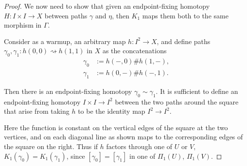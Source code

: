 \documentclass{tufte-handout}
\newcommand{\lecturenum}[1]{\marginnote{\color{red}Lecture #1}}
\theoremstyle{definition}
\begin{document}
\begin{proof}
We now need to show that given an endpoint-fixing homotopy $H\colon I\times I \to X$ 
between paths $\gamma$ and $\eta$, then $K_1$ maps them both to the same morphism in 
$\Gamma$.

Consider
as a warmup, an arbitrary map $h\colon I^2\to X$, and define paths 
$\gamma_0,\gamma_1\colon h(0,0) \rightsquigarrow h(1,1)$ in $X$ as the concatenations
\begin{align*}
\gamma_0 & := h(-,0)\# h(1,-),\\
\gamma_1 & := h(0,-)\# h(-,1).
\end{align*}

Then there is an endpoint-fixing homotopy $\gamma_0 \sim \gamma_1$. It is sufficient to 
define an endpoint-fixing homotopy $I\times I \to I^2$ between the two paths around the 
square that arise from taking $h$ to be the identity map $I^2\to I^2$.
\begin{center}
\end{center}

Here the function is constant on the vertical edges of the square at the two vertices, 
and on each diagonal line as shown maps to the corresponding edges of the square on the 
right.
Thus if $h$ factors through one of $U$ or $V$, $K_1(\gamma_0) = K_1(\gamma_1)$, since 
$[\gamma_0] = [\gamma_1]$ in one of $\Pi_1(U)$, $\Pi_1(V)$.

\lecturenum{12}


\end{proof}
\end{document}
